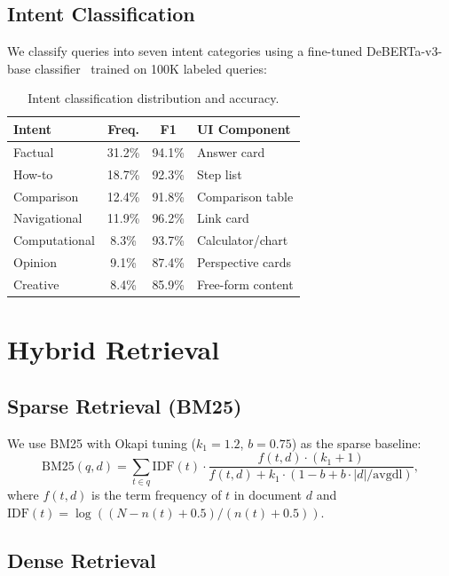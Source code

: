\documentclass[11pt,twocolumn]{article}
\begin{document}
\subsection{Intent Classification}

We classify queries into seven intent categories using a fine-tuned DeBERTa-v3-base classifier~\cite{he2021debertav3} trained on 100K labeled queries:

\begin{table}[H]
\centering
\small
\begin{tabular}{lccl}
\toprule
\textbf{Intent} & \textbf{Freq.} & \textbf{F1} & \textbf{UI Component} \\
\midrule
Factual & 31.2\% & 94.1\% & Answer card \\
How-to & 18.7\% & 92.3\% & Step list \\
Comparison & 12.4\% & 91.8\% & Comparison table \\
Navigational & 11.9\% & 96.2\% & Link card \\
Computational & 8.3\% & 93.7\% & Calculator/chart \\
Opinion & 9.1\% & 87.4\% & Perspective cards \\
Creative & 8.4\% & 85.9\% & Free-form content \\
\bottomrule
\end{tabular}
\caption{Intent classification distribution and accuracy.}
\label{tab:intent}
\end{table}

\section{Hybrid Retrieval}
\label{sec:retrieval}

\subsection{Sparse Retrieval (BM25)}

We use BM25 with Okapi tuning ($k_1 = 1.2$, $b = 0.75$) as the sparse baseline:
\begin{equation}
\text{BM25}(q, d) = \sum_{t \in q} \text{IDF}(t) \cdot \frac{f(t, d) \cdot (k_1 + 1)}{f(t, d) + k_1 \cdot (1 - b + b \cdot |d| / \text{avgdl})},
\end{equation}
where $f(t, d)$ is the term frequency of $t$ in document $d$ and $\text{IDF}(t) = \log((N - n(t) + 0.5) / (n(t) + 0.5))$.

\subsection{Dense Retrieval}
\end{document}
